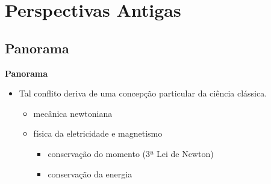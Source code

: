 \section{Perspectivas Antigas}

\subsection{Panorama}
\begin{frame}{\textbf{Panorama}}
	\begin{itemize}
		\item<2->[$\bullet$] Tal conflito deriva de uma \textcolor{NordRed}{concepção 
		 particular da ciência clássica.}
			\begin{itemize}
				\item<4-> mecânica newtoniana
				\item<5-> física da eletricidade e magnetismo
				 \begin{itemize}
						\item<6->[-] conservação do momento (3ª Lei de Newton)
						\item<7->[-] conservação da energia
					\end{itemize}
			\end{itemize}
	\end{itemize}
\end{frame}


